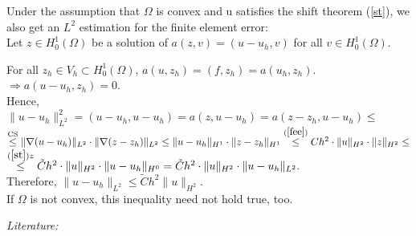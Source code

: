 \documentclass[pagesize]{scrartcl}
\begin{document}

Under the assumption that $\Omega$ is convex and u satisfies the shift theorem (\ref{st}), we also get an $L^2$ estimation for the finite element error:\\[1ex]


Let $z \in H_0^1(\Omega)$ be a solution of $a(z,v) = (u-u_h,v)$ for all  $v \in H_0^1(\Omega)$.

For all $z_h \in V_h \subset H_0^1(\Omega)$, $a(u,z_h) = (f,z_h) = a(u_h,z_h)$. $\Rightarrow a(u-u_h,z_h) = 0$.\\

\medskip
Hence, $\|u-u_h\|_{L^2}^2 = (u-u_h,u-u_h) = a(z,u-u_h) = a(z-z_h,u-u_h) \leq$\\
$\overset{\text{CS}}{\leq} \|\nabla(u-u_h)\|_{L^2} \cdot \|\nabla(z-z_h)\|_{L^2} \leq \|u-u_h\|_{H^1}  \cdot \|z-z_h\|_{H^1} \overset{(\ref{fee})}{\leq} Ch^2 \cdot \|u\|_{H^2} \cdot \|z\|_{H^2} \leq$\\
$\overset{(\ref{st}) z}{\leq} \tilde{C}h^2\cdot \|u\|_{H^2} \cdot \|u-u_h\|_{H^0} = \tilde{C}h^2\cdot \|u\|_{H^2}\cdot \|u-u_h\|_{L^2}.$\\

\medskip
Therefore, $\|u-u_h\|_{L^2} \leq \tilde{C}h^2 \|u\|_{H^2}$.\\[2.5ex]

If $\Omega$ is not convex, this inequality need not hold true, too.



\newpage
\emph{Literature:} 

\end{document}
